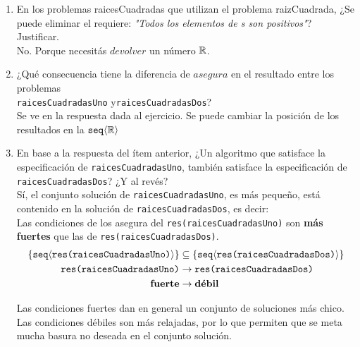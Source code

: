 \documentclass[12pt,a4paper,spanish]{article}
\begin{document}
\ejercicio

\begin{enumerate}[label=\arabic*.]
	\item
	      En los problemas raicesCuadradas que utilizan el problema raizCuadrada, ¿Se puede eliminar el requiere:
	      \textit{"Todos los elementos de s son positivos"}? Justificar.  \\
	      \separadorCorto
	      No. Porque necesitás $devolver$ un número $\mathbb R$.

	\item
	      ¿Qué consecuencia tiene la diferencia de $asegura$ en el resultado entre los problemas\\
	      \texttt{raicesCuadradasUno} y\texttt{raicesCuadradasDos}?  \\
	      \separadorCorto
	      Se ve en la respuesta dada al ejercicio. Se puede cambiar la posición de los resultados en la $\texttt{seq} \langle \mathbb R \rangle$

	\item
	      En base a la respuesta del ítem anterior, ¿Un algoritmo que satisface la especificación de \texttt{raicesCuadradasUno}, también
	      satisface la especificación de \texttt{raicesCuadradasDos}? ¿Y al revés? \\
	      \separadorCorto
	      Sí, el conjunto solución de \texttt{raicesCuadradasUno}, es más pequeño, está contenido en la solución de \texttt{raicesCuadradasDos},
	      es decir:\\
	      Las condiciones de los asegura del \texttt{res(raicesCuadradasUno)} son \textbf{más fuertes} que las de \texttt{res(raicesCuadradasDos)}.
	      \begin{align*}
		      \left\{ \texttt{seq} \langle  \texttt{res(raicesCuadradasUno)} \rangle \right\} & \subseteq \left\{ \texttt{seq} \langle \texttt{res(raicesCuadradasDos)} \rangle \right\} \\
		      \texttt{res(raicesCuadradasUno)}              & \rightarrow \texttt{res(raicesCuadradasDos)}             \\
		      \textbf{fuerte}                               & \rightarrow \textbf{débil}
	      \end{align*}

	      Las condiciones fuertes dan en general un conjunto de soluciones más chico. Las condiciones débiles son más relajadas, por lo que permiten
	      que se meta mucha basura no deseada en el conjunto solución.


\end{enumerate}
\end{document}
